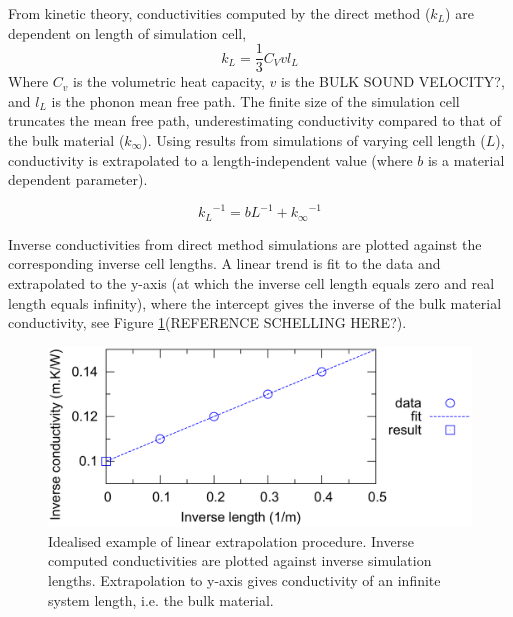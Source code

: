\documentclass[%
preprint,                                  %
nofootinbib,
 amsmath,amssymb,
 aps,
]{revtex4-1}
\begin{document}


From kinetic theory, conductivities computed by the direct method ($k_L$) are dependent on length of simulation cell,
\begin{equation}
k_{L} = \frac{1}{3} C_{V} v l_{L} \label{length-dep}
\end{equation}
Where $C_v$ is the volumetric heat capacity, $v$ is the BULK SOUND VELOCITY?, and $l_L$ is the phonon mean free path. The finite size of the simulation cell truncates the mean free path, underestimating conductivity compared to that of the bulk material ($k_\infty$). Using results from simulations of varying cell length ($L$), conductivity is extrapolated to a length-independent value (where $b$ is a material dependent parameter). 

\begin{equation}
{k_{L}}^{-1} = b L^{-1} + {k_{\infty}}^{-1} \label{linear-extrap}
\end{equation}

Inverse conductivities from direct method simulations are plotted against the corresponding inverse cell lengths. A linear trend is fit to the data and extrapolated to the y-axis (at which the inverse cell length equals zero and real length equals infinity), where the intercept gives the inverse of the bulk material conductivity, see Figure \ref{fig:ideal}(REFERENCE SCHELLING HERE?).

\begin{figure}[h]
  \includegraphics[width=\linewidth]{images/ideal_extrap.png}
  \caption{Idealised example of linear extrapolation procedure. Inverse computed conductivities are plotted against inverse simulation lengths. Extrapolation to y-axis gives conductivity of an infinite system length, i.e. the bulk material.}
  \label{fig:ideal}
\end{figure}
\end{document}
